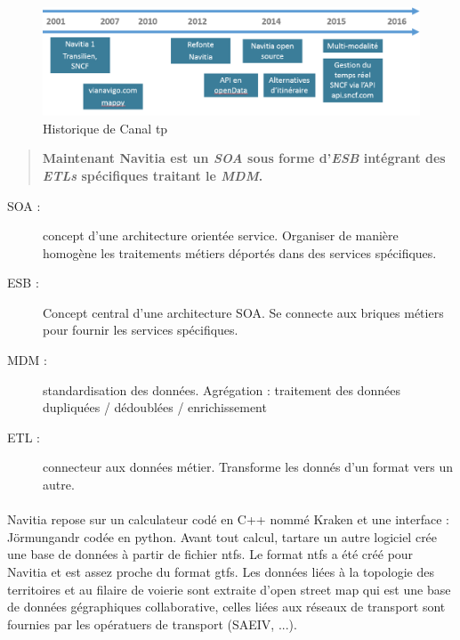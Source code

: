 \documentclass[a4paper]{report}
\begin{document}
\begin{figure}[H]
	\begin{center}
		\includegraphics[width=400pt]{image/historique_navitia}
		\caption{Historique de Canal tp}
		\label{Historique de Canal tp}
	\end{center}
\end{figure}

\begin{quote}
	\textbf{Maintenant Navitia est un \emph{SOA} sous forme d'\emph{ESB} intégrant des \emph{ETLs} spécifiques traitant le \emph{MDM}.}
\end{quote}
\begin{description}
	\item[SOA :] concept d'une architecture orientée service. Organiser de manière homogène les traitements métiers déportés dans des services spécifiques.
	\item[ESB :] Concept central d'une architecture SOA. Se connecte aux briques métiers pour fournir les services spécifiques.
	\item[MDM :] standardisation des données. Agrégation : traitement des données dupliquées / dédoublées / enrichissement
	\item[ETL :] connecteur aux données métier. Transforme les donnés d'un format vers un autre.
\end{description}

\paragraph{}Navitia repose sur un calculateur codé en C++ nommé Kraken et une interface : Jörmungandr codée en python. Avant tout calcul, tartare un autre logiciel crée une base de données à partir de fichier ntfs. Le format ntfs a été créé pour Navitia et est assez proche du format gtfs. Les données liées à la topologie des territoires et au filaire de voierie sont extraite d'open street map qui est une base de données gégraphiques collaborative, celles liées aux réseaux de transport sont fournies par les opératuers de transport (SAEIV, ...).
\end{document}
